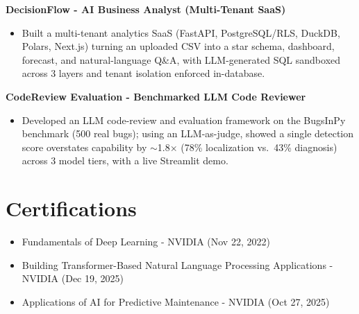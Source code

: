 \documentclass[11pt,a4paper]{article}
\newcommand{\proj}[1]{\textbf{#1}\par}
\begin{document}
\proj{DecisionFlow - AI Business Analyst (Multi-Tenant SaaS)}
\begin{itemize}
  \item Built a multi-tenant analytics SaaS (FastAPI, PostgreSQL/RLS, DuckDB, Polars, Next.js) turning an
        uploaded CSV into a star schema, dashboard, forecast, and natural-language Q\&A, with LLM-generated
        SQL sandboxed across 3 layers and tenant isolation enforced in-database.
\end{itemize}

\proj{CodeReview Evaluation - Benchmarked LLM Code Reviewer}
\begin{itemize}
  \item Developed an LLM code-review and evaluation framework on the BugsInPy benchmark (500 real bugs); using
        an LLM-as-judge, showed a single detection score overstates capability by $\sim$1.8$\times$
        (78\% localization vs.\ 43\% diagnosis) across 3 model tiers, with a live Streamlit demo.
\end{itemize}

\section{Certifications}
\begin{itemize}
  \item Fundamentals of Deep Learning - NVIDIA {\color{muted}(Nov 22, 2022)}
  \item Building Transformer-Based Natural Language Processing Applications - NVIDIA {\color{muted}(Dec 19, 2025)}
  \item Applications of AI for Predictive Maintenance - NVIDIA {\color{muted}(Oct 27, 2025)}
\end{itemize}

\end{document}

